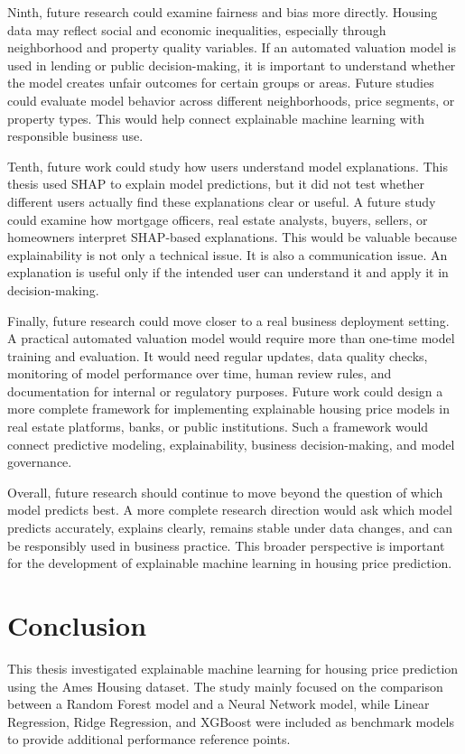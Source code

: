 \documentclass[12pt,a4paper,oneside,openany]{book}
\begin{document}
Ninth, future research could examine fairness and bias more directly. Housing data may reflect social and economic inequalities, especially through neighborhood and property quality variables. If an automated valuation model is used in lending or public decision-making, it is important to understand whether the model creates unfair outcomes for certain groups or areas. Future studies could evaluate model behavior across different neighborhoods, price segments, or property types. This would help connect explainable machine learning with responsible business use.

Tenth, future work could study how users understand model explanations. This thesis used SHAP to explain model predictions, but it did not test whether different users actually find these explanations clear or useful. A future study could examine how mortgage officers, real estate analysts, buyers, sellers, or homeowners interpret SHAP-based explanations. This would be valuable because explainability is not only a technical issue. It is also a communication issue. An explanation is useful only if the intended user can understand it and apply it in decision-making.

Finally, future research could move closer to a real business deployment setting. A practical automated valuation model would require more than one-time model training and evaluation. It would need regular updates, data quality checks, monitoring of model performance over time, human review rules, and documentation for internal or regulatory purposes. Future work could design a more complete framework for implementing explainable housing price models in real estate platforms, banks, or public institutions. Such a framework would connect predictive modeling, explainability, business decision-making, and model governance.

Overall, future research should continue to move beyond the question of which model predicts best. A more complete research direction would ask which model predicts accurately, explains clearly, remains stable under data changes, and can be responsibly used in business practice. This broader perspective is important for the development of explainable machine learning in housing price prediction.


\chapter{Conclusion}

This thesis investigated explainable machine learning for housing price prediction using the Ames Housing dataset. The study mainly focused on the comparison between a Random Forest  model and a Neural Network model, while Linear Regression, Ridge Regression, and XGBoost were included as benchmark models to provide additional performance reference points.
\end{document}
